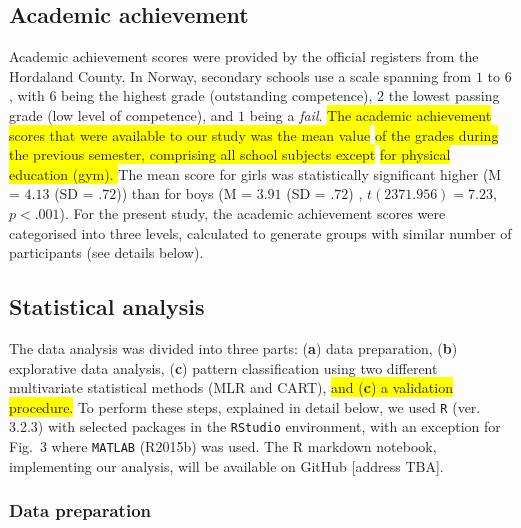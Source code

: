 \documentclass[10pt,letterpaper]{article}
\begin{document}
\subsection*{Academic achievement}
Academic achievement scores were provided by the official registers from the Hordaland County. In Norway, secondary schools use a scale spanning from $1$ to $6$, with $6$ 
being the highest grade (outstanding competence),  $2$  the lowest passing grade (low level of competence), and $1$ being a {\it fail}. 
\colorbox{yellow}{The academic achievement scores that were available to our study was the mean value} \colorbox{yellow}{of the grades during the previous semester, comprising all school subjects except} \colorbox{yellow}{for physical education (gym). }
The mean score for girls was statistically significant higher  (M = $4.13$ (SD = $.72$))  than for boys (M = $3.91$ (SD = $.72$) , $t(2371.956) = 7.23$, $p  <  .001$). 
For the present study, the academic achievement scores were categorised into three levels, calculated to generate groups with similar number of participants (see details below). 



\subsection*{Statistical analysis}
The data analysis was divided into three parts: ({\bf  a}) data preparation, ({\bf b}) explorative data analysis, ({\bf c}) pattern classification using two different multivariate statistical methods (MLR and CART), \colorbox{yellow}{and ({\bf c}) a validation procedure.} 
To perform these steps, explained in detail below, we used  {\tt R} (ver. 3.2.3) with selected packages in the 
{\tt RStudio} environment, with an exception for Fig.~3
where {\tt MATLAB} (R2015b) was used. The R markdown notebook, implementing our analysis, will be available on GitHub [address TBA].  

\vspace{3mm}
\subsubsection*{Data preparation}
\end{document}
